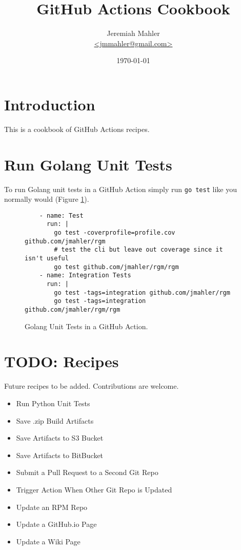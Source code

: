 \documentclass{article}
\begin{document}
\title{GitHub Actions Cookbook}
\author{
	\Large{Jeremiah Mahler}\\
	\small{\href{mailto:jmmahler@gmail.com}{\textless jmmahler@gmail.com\textgreater}}
}
\date{\today}
\maketitle

\thispagestyle{empty}
\tableofcontents

\section{Introduction}

This is a cookbook of GitHub Actions \autocite{githubactions} recipes.

\section{Run Golang Unit Tests}

To run Golang unit tests in a GitHub Action simply run \verb+go test+
like you normally would \autocite{gotest} (Figure \ref{fig:gotest}).

\begin{figure}[!ht]
\begin{lstlisting}
    - name: Test
      run: |
        go test -coverprofile=profile.cov github.com/jmahler/rgm
        # test the cli but leave out coverage since it isn't useful
        go test github.com/jmahler/rgm/rgm
    - name: Integration Tests
      run: |
        go test -tags=integration github.com/jmahler/rgm
        go test -tags=integration github.com/jmahler/rgm/rgm
\end{lstlisting}
\caption{Golang Unit Tests in a GitHub Action.}
\label{fig:gotest}
\end{figure}

\section{TODO: Recipes}

Future recipes to be added.
Contributions are welcome.

\begin{itemize}
\item{Run Python Unit Tests}
\item{Save .zip Build Artifacts}
\item{Save Artifacts to S3 Bucket}
\item{Save Artifacts to BitBucket}
\item{Submit a Pull Request to a Second Git Repo}
\item{Trigger Action When Other Git Repo is Updated}
\item{Update an RPM Repo}
\item{Update a GitHub.io Page}
\item{Update a Wiki Page}
\end{itemize}

\clearpage
\printbibliography[heading=bibintoc]
\end{document}
